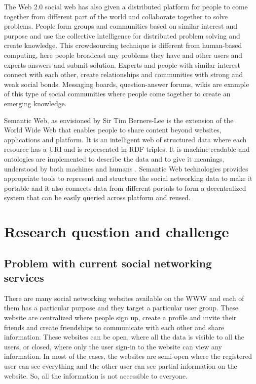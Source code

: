 The Web 2.0 social web has also given a distributed platform for people to come together from different part of the world and collaborate together to solve problems. People form groups and communities based on similar interest and purpose and use the collective intelligence for distributed problem solving and create knowledge. This crowdsourcing technique is different from human-based computing, here people broadcast any problems they have and other users and experts answers and submit solution. Experts and people with similar interest connect with each other, create relationships and communities with strong and weak social bonds. Messaging boards, question-answer forums, wikis are example of this type of social communities where people come together to create an emerging knowledge.

Semantic Web, as envisioned by Sir Tim Berners-Lee is the extension of the World Wide Web that enables people to share content beyond websites, applications and platform. It is an intelligent web of structured data where each resource has a URI and is represented in RDF triples. It is machine-readable and ontologies are implemented to describe the data and to give it meanings, understood by both machines and humans \cite{berners2001semantic}. Semantic Web technologies provides appropriate tools to represent and structure the social networking data to make it portable and it also connects data from different portals to form a decentralized system that can be easily queried across platform and reused.

\section{Research question and challenge}

\subsection{Problem with current social networking services}

There are many social networking websites available on the WWW and each of them has a particular purpose and they target a particular user group. These website are centralized where people sign up, create a profile and invite their friends and create friendships to communicate with each other and share information. These websites can be open, where all the data is visible to all the users, or closed, where only the user sign-in to the website can view any information. In most of the cases, the websites are semi-open where the registered user can see everything and the other user can see partial information on the website. So, all the information is not accessible to everyone.

